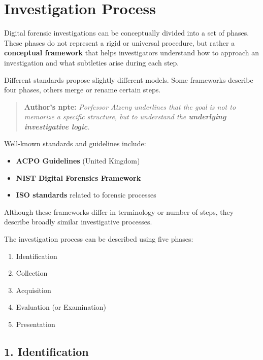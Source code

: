 \section{Investigation Process}

Digital forensic investigations can be conceptually divided into a set of phases.\\ 
These phases do not represent a rigid or universal procedure, but rather a \textbf{conceptual framework} that helps investigators understand how to approach an investigation and what subtleties arise during each step.
\medskip

\noindent
Different standards propose slightly different models. Some frameworks describe four phases, others merge or rename certain steps.

\begin{quotation}
  \textbf{Author's npte:} \textit{ Porfessor Atzeny underlines that the goal is not to memorize a specific structure, but to understand the \textbf{underlying investigative logic}.}
\end{quotation}

\noindent
Well-known standards and guidelines include:

\begin{itemize}
\item \textbf{ACPO Guidelines} (United Kingdom)
\item \textbf{NIST Digital Forensics Framework}
\item \textbf{ISO standards} related to forensic processes
\end{itemize}

\noindent
Although these frameworks differ in terminology or number of steps, they describe broadly similar investigative processes.
\medskip

\noindent
The investigation process can be described using five phases:

\begin{enumerate}
\item Identification
\item Collection
\item Acquisition
\item Evaluation (or Examination)
\item Presentation
\end{enumerate}

\subsection{1. Identification}

